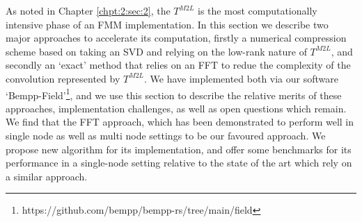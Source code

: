 As noted in Chapter \ref{chpt:2:sec:2}, the $T^{M2L}$ is the most computationally intensive phase of an FMM implementation. In this section we describe two major approaches to accelerate its computation, firstly a numerical compression scheme based on taking an SVD and relying on the low-rank nature of $T^{M2L}$, and secondly an `exact' method that relies on an FFT to redue the complexity of the convolution represented by $T^{M2L}$. We have implemented both via our software `Bempp-Field'\footnote{https://github.com/bempp/bempp-rs/tree/main/field}, and we use this section to describe the relative merits of these approaches, implementation challenges, as well as open questions which remain. We find that the FFT approach, which has been demonstrated to perform well in single node \cite{wang2021exafmm} as well as multi node \cite{malhotra2015pvfmm} settings to be our favoured approach. We propose new algorithm for its implementation, and offer some benchmarks for its performance in a single-node setting relative to the state of the art \cite{wang2021exafmm,malhotra2015pvfmm} which rely on a similar approach.


